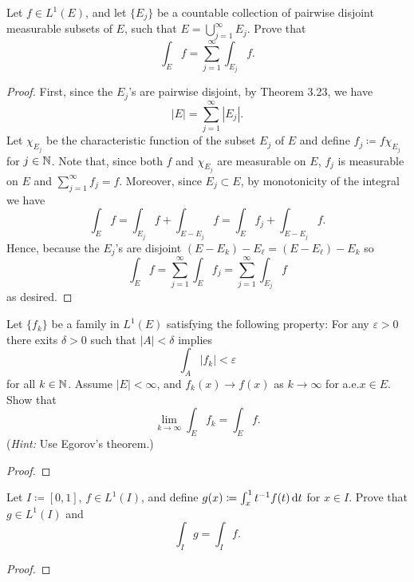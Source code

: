 \begin{problem}
Let $f\in L^1(E)$, and let $\{E_j\}$ be a countable collection of pairwise
disjoint measurable subsets of $E$, such that $E=\bigcup_{j=1}^\infty
E_j$. Prove that
\[
\int_E f=\sum_{j=1}^\infty\int_{E_j}f.
\]
\end{problem}
\begin{proof}
First, since the $E_j$'s are pairwise disjoint, by Theorem 3.23, we have
\begin{equation}
\label{eq:disjoint-measure-2-2}
|E|=\sum_{j=1}^\infty|E_j|.
\end{equation}
Let $\chi_{E_j}$ be the characteristic function of the subset $E_j$ of
$E$ and define $f_j\coloneqq f\chi_{E_j}$ for $j\in\mathbb{N}$. Note that, since
both $f$ and $\chi_{E_j}$ are measurable on $E$, $f_j$ is
measurable on $E$ and $\sum_{j=1}^\infty f_j=f$. Moreover, since
$E_j\subset E$, by monotonicity of the integral we have
\begin{equation}
\label{eq:monotonicity-2-2}
\int_{E} f=
\int_{E_j} f+\int_{E\minus E_j}f=
\int_E f_j+\int_{E\minus E_j}f.
\end{equation}
Hence, because the $E_j$'s are disjoint $(E\minus E_k)\minus
E_\ell=(E\minus E_\ell)\minus E_k$ so
\begin{equation}
\label{eq:desired-sum-2}
\int_E f=\sum_{j=1}^\infty\int_E f_j=\sum_{j=1}^\infty\int_{E_j}f
\end{equation}
as desired.
\end{proof}

\begin{problem}
Let $\{f_k\}$ be a family in $L^1(E)$ satisfying the following property:
For any $\varepsilon>0$ there exits $\delta>0$ such that $|A|<\delta$
implies
\[
\int_A |f_k|<\varepsilon
\]
for all $k\in\mathbb{N}$. Assume $|E|<\infty$, and $f_k(x)\to f(x)$ as
$k\to\infty$ for a.e.\@ $x\in E$. Show that
\[
\lim_{k\to\infty}\int_E f_k=\int_E f.
\]
(\emph{Hint:} Use Egorov's theorem.)
\end{problem}
\begin{proof}

\end{proof}

\begin{problem}
Let $I\coloneqq[0,1]$, $f\in L^1(I)$, and define $g(x)\coloneqq\int_x^1
t^{-1}f(t)\mathop{}\!\mathrm{d} t$ for $x\in I$. Prove that $g\in L^1(I)$ and
\[
\int_I g=\int_I f.
\]
\end{problem}
\begin{proof}
\end{proof}

